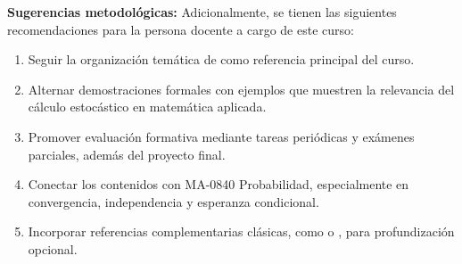 \begin{refsection}
\textbf{Sugerencias metodológicas:} Adicionalmente, se tienen las siguientes recomendaciones para la persona docente a cargo de este curso:

\begin{enumerate}
    \item Seguir la organización temática de \cite{LeG16} como referencia principal del curso.
    \item Alternar demostraciones formales con ejemplos que muestren la relevancia del cálculo estocástico en matemática aplicada.
    \item Promover evaluación formativa mediante tareas periódicas y exámenes parciales, además del proyecto final.
    \item Conectar los contenidos con MA-0840 Probabilidad, especialmente en convergencia, independencia y esperanza condicional.
    \item Incorporar referencias complementarias clásicas, como \cite{KS91} o \cite{RY99}, para profundización opcional.
\end{enumerate}

\nocite{LeG16}
\nocite{KS91}
\nocite{RY99}
\nocite{Oks03}

\printcursosbibliography
\end{refsection}
